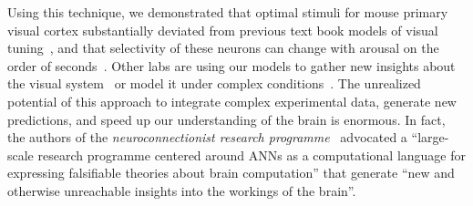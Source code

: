 \documentclass[B2,COG]{ercgrant}
\begin{document}
Using this technique, we demonstrated that optimal stimuli for mouse primary visual cortex substantially deviated from previous text book models of visual tuning~\parencite{Hubel1959-zs}, and that selectivity of these neurons can change with arousal on the order of seconds~\parencite{Franke2022-do}.
Other labs are using our models to gather new insights about the visual system~\parencite{Hofling2022-wr} or model it under complex conditions~\parencite{Parker2022-ac}.
The unrealized potential of this approach to integrate complex experimental data, generate new predictions, and speed up our understanding of the brain is enormous. 
In fact, the authors of the \textit{neuroconnectionist research programme}~\parencite{Doerig2022-ex} advocated a ``large-scale research programme centered around ANNs as a computational language for expressing falsifiable theories about brain computation'' that generate ``new and otherwise unreachable insights into the workings of the brain''. 
\end{document}
